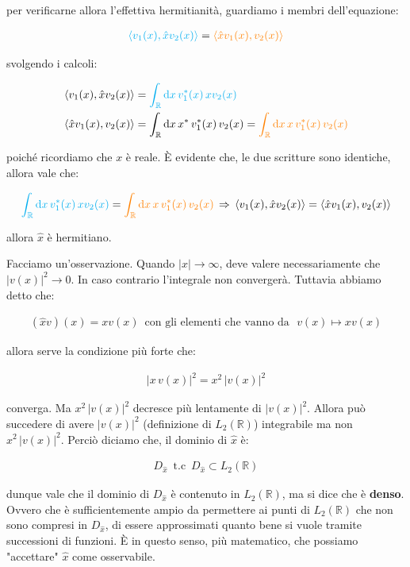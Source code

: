 	per verificarne allora l'effettiva hermitianità, guardiamo i membri dell'equazione:
	
\begin{align*}
	\textcolor{cyan}{\langle v_1(x), \hat{x}v_2(x) \rangle} = \textcolor{orange}{\langle \hat{x} v_1(x), v_2(x) \rangle }
\end{align*}

	svolgendo i calcoli:
	
\begin{align*}
	& \langle v_1(x), \hat{x}v_2(x) \rangle =  \textcolor{cyan}{ \int_{\mathbb{R}} \dd x \, v^*_1(x) \, xv_2(x) } \\
	& \langle \hat{x} v_1(x), v_2(x) \rangle = \int_{\mathbb{R}} \dd x \, x^* \, v^*_1(x) \, v_2(x) = \textcolor{orange}{ \int_{\mathbb{R}} \dd x \, x \, v^*_1(x) \, v_2(x) }
\end{align*}

	poiché ricordiamo che $x$ è reale. È evidente che, le due scritture sono identiche, allora vale che:

\begin{align*}
	\textcolor{cyan}{ \int_{\mathbb{R}} \dd x \, v^*_1(x) \, xv_2(x) }  = \textcolor{orange}{ \int_{\mathbb{R}} \dd x \, x \, v^*_1(x) \, v_2(x) } \, \Rightarrow \, \langle v_1(x), \hat{x}v_2(x) \rangle = \langle \hat{x}v_1(x), v_2(x) \rangle 
\end{align*}
	
	allora $\hat{x}$ è hermitiano.

\begin{myapprf}

	Facciamo un'osservazione. Quando $|x| \to \infty$, deve valere necessariamente che $|v(x)|^2 \to 0$. In caso contrario l'integrale non convergerà. Tuttavia abbiamo detto che:
	
\begin{align*}
	(\hat{x}v)(x) = xv(x) \,\,\, \text{con gli elementi che vanno da } \,\, v(x) \mapsto xv(x)
\end{align*}

	allora serve la condizione più forte che:

\begin{align*}
	|x\, v(x)|^2 = x^2 \, |v(x)|^2
\end{align*}

	converga. Ma $x^2 \, |v(x)|^2$ decresce più lentamente di $|v(x)|^2$. Allora può succedere di avere $|v(x)|^2$ (definizione di $L_2(\mathbb{R})$) integrabile ma non $x^2 \, |v(x)|^2$. Perciò diciamo che, il dominio di $\hat{x}$ è:
	
\begin{align*}
	D_{\hat{x}} \,\,\, \text{t.c} \,\, \, D_{\hat{x}} \subset L_2(\mathbb{R})
\end{align*}

	dunque vale che il dominio di $D_{\hat{x}}$ è contenuto in $L_2(\mathbb{R})$, ma si dice che è \textbf{denso}. Ovvero che è sufficientemente ampio da permettere ai punti di $L_2(\mathbb{R})$ che non sono compresi in $D_{\hat{x}}$, di essere approssimati quanto bene si vuole tramite successioni di funzioni. È in questo senso, più matematico, che possiamo "accettare" $\hat{x}$ come osservabile.
\end{myapprf}

